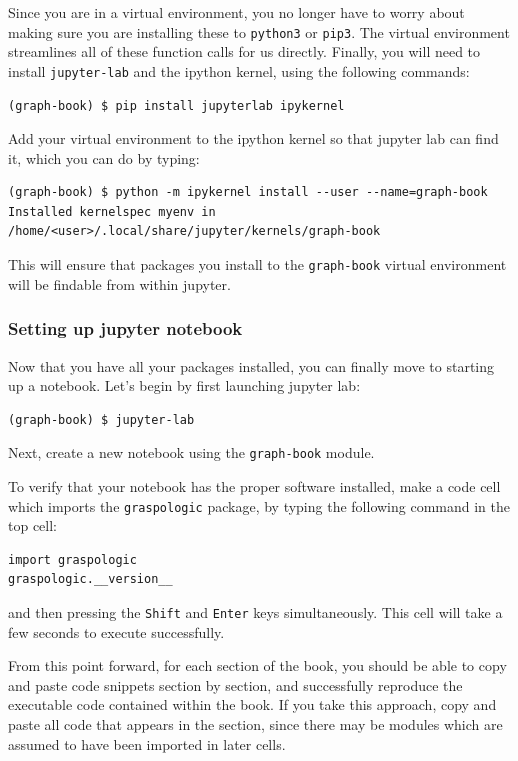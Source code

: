 Since you are in a virtual environment, you no longer have to worry about making sure you are installing these to \texttt{python3} or \texttt{pip3}. The virtual environment streamlines all of these function calls for us directly. Finally, you will need to install \texttt{jupyter-lab} and the ipython kernel, using the following commands:


\begin{lstlisting}[style=bash]
(graph-book) $ pip install jupyterlab ipykernel
\end{lstlisting}

Add your virtual environment to the ipython kernel so that jupyter lab can find it, which you can do by typing:


\begin{lstlisting}[style=bash]
(graph-book) $ python -m ipykernel install --user --name=graph-book
Installed kernelspec myenv in /home/<user>/.local/share/jupyter/kernels/graph-book
\end{lstlisting}

This will ensure that packages you install to the \texttt{graph-book} virtual environment will be findable from within jupyter.

\subsubsection*{Setting up jupyter notebook}

Now that you have all your packages installed, you can finally move to starting up a notebook. Let's begin by first launching jupyter lab:

\begin{lstlisting}[style=bash]
(graph-book) $ jupyter-lab

\end{lstlisting}

Next, create a new notebook using the \texttt{graph-book} module.

To verify that your notebook has the proper software installed, make a code cell which imports the \texttt{graspologic} package, by typing the following command in the top cell:

\begin{lstlisting}[style=bash]
import graspologic
graspologic.__version__
\end{lstlisting}

and then pressing the \texttt{Shift} and \texttt{Enter} keys simultaneously. This cell will take a few seconds to execute successfully.


From this point forward, for each section of the book, you should be able to copy and paste code snippets section by section, and successfully reproduce the executable code contained within the book. If you take this approach, copy and paste all code that appears in the section, since there may be modules which are assumed to have been imported in later cells.

\newpage